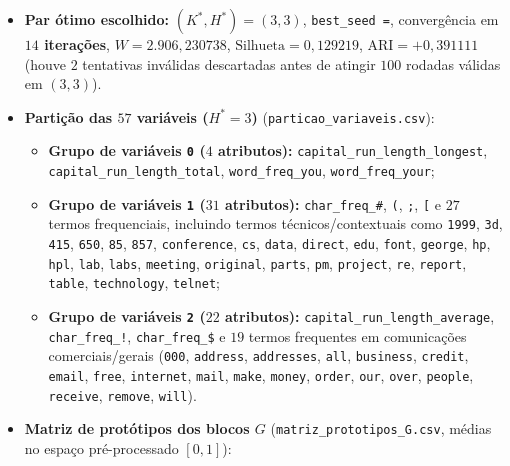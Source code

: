 \documentclass[a4paper,11pt]{article}
\begin{document}
\begin{itemize}[leftmargin=1.5em, itemsep=0.25em, topsep=0.25em]
  \item \textbf{Par ótimo escolhido:} $(K^*, H^*) = (3, 3)$, \texttt{best\_\allowbreak seed =}, convergência em \textbf{$14$ iterações}, $W = 2.906,230738$, $\text{Silhueta} = 0,129219$, $\text{ARI} = +0,391111$ (houve $2$ tentativas inválidas descartadas antes de atingir $100$ rodadas válidas em $(3,3)$).
  \item \textbf{Partição das $57$ variáveis ($H^* = 3$)} (\texttt{particao\_\allowbreak variaveis.csv}):
\begin{itemize}[leftmargin=1.5em, itemsep=0.25em, topsep=0.25em]
  \item \textbf{Grupo de variáveis \texttt{0} ($4$ atributos):} \texttt{capital\_\allowbreak run\_\allowbreak length\_\allowbreak longest}, \texttt{capital\_\allowbreak run\_\allowbreak length\_\allowbreak total}, \texttt{word\_\allowbreak freq\_\allowbreak you}, \texttt{word\_\allowbreak freq\_\allowbreak your};
  \item \textbf{Grupo de variáveis \texttt{1} ($31$ atributos):} \texttt{char\_\allowbreak freq\_\allowbreak \#}, \texttt{(\allowbreak }, \texttt{;}, \texttt{[} e $27$ termos frequenciais, incluindo termos técnicos/contextuais como \texttt{1999}, \texttt{3d}, \texttt{415}, \texttt{650}, \texttt{85}, \texttt{857}, \texttt{conference}, \texttt{cs}, \texttt{data}, \texttt{direct}, \texttt{edu}, \texttt{font}, \texttt{george}, \texttt{hp}, \texttt{hpl}, \texttt{lab}, \texttt{labs}, \texttt{meeting}, \texttt{original}, \texttt{parts}, \texttt{pm}, \texttt{project}, \texttt{re}, \texttt{report}, \texttt{table}, \texttt{technology}, \texttt{telnet};
  \item \textbf{Grupo de variáveis \texttt{2} ($22$ atributos):} \texttt{capital\_\allowbreak run\_\allowbreak length\_\allowbreak average}, \texttt{char\_\allowbreak freq\_\allowbreak !}, \texttt{char\_\allowbreak freq\_\allowbreak \$} e $19$ termos frequentes em comunicações comerciais/gerais (\texttt{000}, \texttt{address}, \texttt{addresses}, \texttt{all}, \texttt{business}, \texttt{credit}, \texttt{email}, \texttt{free}, \texttt{internet}, \texttt{mail}, \texttt{make}, \texttt{money}, \texttt{order}, \texttt{our}, \texttt{over}, \texttt{people}, \texttt{receive}, \texttt{remove}, \texttt{will}).
\end{itemize}
  \item \textbf{Matriz de protótipos dos blocos $G$} (\texttt{matriz\_\allowbreak prototipos\_\allowbreak G.csv}, médias no espaço pré-processado $[0, 1]$):
\end{itemize}
\end{document}
